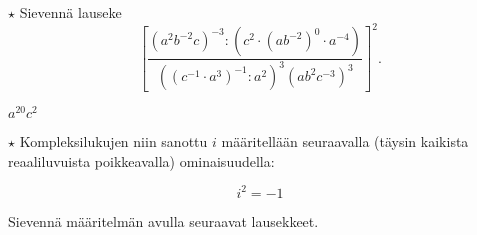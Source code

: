 \begin{tehtavasivu}
\begin{tehtava}
  		$\star$ Sievennä lauseke
$$\left[ \frac{(a^2b^{-2}c)^{-3}:\left(c^2\cdot (ab^{-2})^0 \cdot a^{-4}\right)}
{\left((c^{-1}\cdot a^3)^{-1}:a^2\right)^3(ab^2c^{-3})^3} \right]^2.$$
	\begin{vastaus}
	$a^{20}c^2$
	\end{vastaus}
\end{tehtava} 

\begin{tehtava}
$\star$ Kompleksilukujen niin sanottu  $i$ määritellään seuraavalla (täysin kaikista reaaliluvuista poikkeavalla) ominaisuudella:

$$i^2=-1$$

Sievennä määritelmän avulla seuraavat lausekkeet.
	\begin{vastaus}
	\end{vastaus}
\end{tehtava}

\end{tehtavasivu}